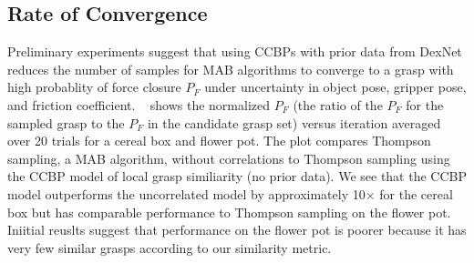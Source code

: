 \subsection{Rate of Convergence}

Preliminary experiments suggest that using CCBPs with prior data from DexNet reduces the number of samples for MAB algorithms to converge to a grasp with high probablity of force closure $P_F$ under uncertainty in object pose, gripper pose, and friction coefficient.
~ shows the normalized $P_F$ (the ratio of the $P_F$ for the sampled grasp to the $P_F$ in the candidate grasp set) versus iteration averaged over 20 trials for a cereal box and flower pot.
The plot compares Thompson sampling, a MAB algorithm, without correlations to Thompson sampling using the CCBP model of local grasp similiarity (no prior data).
We see that the CCBP model outperforms the uncorrelated model by approximately 10$\times$ for the cereal box but has comparable performance to Thompson sampling on the flower pot.
Iniitial reuslts suggest that performance on the flower pot is poorer because it has very few similar grasps according to our similarity metric.

